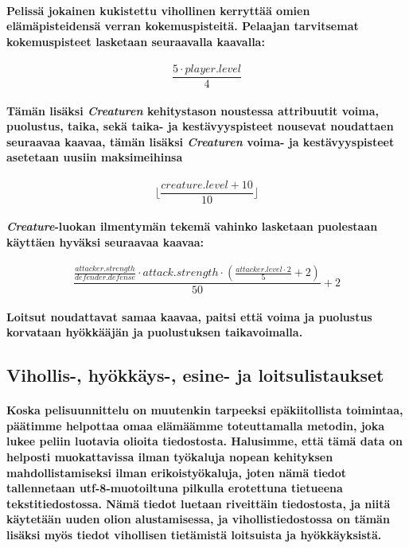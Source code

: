 \documentclass[10pt,a4paper,draft]{article}
\begin{document}
\paragraph{Pelissä jokainen kukistettu vihollinen kerryttää omien elämäpisteidensä verran kokemuspisteitä. Pelaajan tarvitsemat kokemuspisteet lasketaan seuraavalla kaavalla:}
\[\frac{5\cdot player.level}{4}\]
\paragraph{Tämän lisäksi \emph{Creaturen} kehitystason noustessa attribuutit voima, puolustus, taika, sekä taika- ja kestävyyspisteet nousevat noudattaen seuraavaa kaavaa, tämän lisäksi \emph{Creaturen} voima- ja kestävyyspisteet asetetaan uusiin maksimeihinsa}
\[\lfloor\frac{creature.level+10}{10}\rfloor\]
\paragraph{\emph{Creature}-luokan ilmentymän tekemä vahinko lasketaan puolestaan käyttäen hyväksi seuraavaa kaavaa:}
\[\frac{\frac{attacker.strength}{defender.defense} \cdot attack.strength \cdot (\frac{attacker.level \cdot 2}{5}+2)}{50}+2\]
\paragraph{Loitsut noudattavat samaa kaavaa, paitsi että voima ja puolustus korvataan hyök\-kää\-jän ja puolustuksen taikavoimalla.}


\subsection{Vihollis-, hyökkäys-, esine- ja loitsulistaukset}

\paragraph{Koska pelisuunnittelu on muutenkin tarpeeksi epäkiitollista toimintaa, päätimme helpottaa omaa elämäämme toteuttamalla metodin, joka lukee peliin luotavia olioita tiedostosta. Halusimme, että tämä data on helposti muokattavissa ilman työkaluja nopean kehityksen mahdollistamiseksi ilman erikoistyökaluja, joten nämä tiedot tallennetaan utf-8-muotoiltuna pilkulla erotettuna tietueena tekstitiedostossa. Nämä tiedot luetaan riveittäin tiedostosta, ja niitä käytetään uuden olion alustamisessa, ja vihollistiedostossa on tämän lisäksi myös tiedot vihollisen tietämistä loitsuista ja hyökkäyksistä.}
\end{document}
